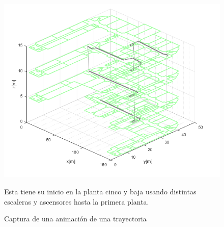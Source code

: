 \begin{figure}
    \centering
    \includegraphics[width=0.8\columnwidth]{img/Design/untitled.png}
    \caption[]{Captura de una animación de una trayectoria}
    \label{fig:animation}
    \footnotesize
    Esta tiene su inicio en la planta cinco y baja usando distintas escaleras y ascensores hasta la primera planta.
\end{figure}
